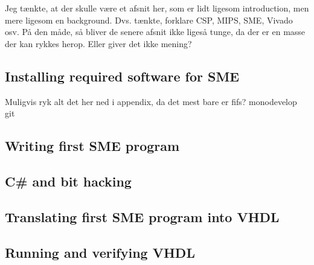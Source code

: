 Jeg tænkte, at der skulle være et afsnit her, som er lidt ligesom introduction, men mere ligesom en background. Dvs. tænkte, forklare CSP, MIPS, SME, Vivado osv. På den måde, så bliver de senere afsnit ikke ligeså tunge, da der er en masse der kan rykkes herop. Eller giver det ikke mening? 

\subsection{Installing required software for SME} Muligvis ryk alt det her ned
i appendix, da det mest bare er fifs?
monodevelop git
\subsection{Writing first SME program}
\subsection{C\# and bit hacking}
\subsection{Translating first SME program into VHDL}
\subsection{Running and verifying VHDL}
